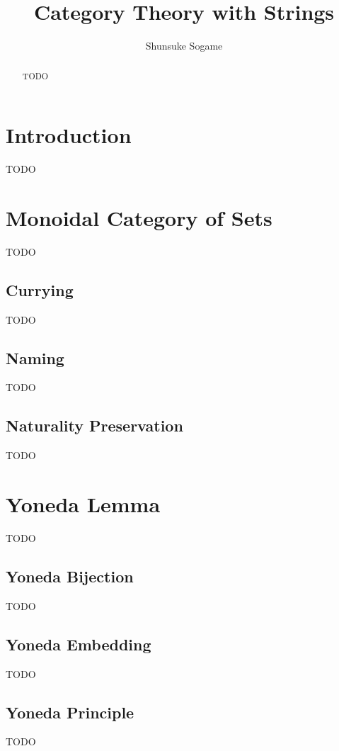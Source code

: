 \documentclass{article}
\title{Category Theory with Strings}
\author{Shunsuke Sogame}
\theoremstyle{break}
\numberwithin{theorem}{section}
\begin{document}
\maketitle

\begin{abstract}
    TODO
\end{abstract}

\section{Introduction}
\label{sec:introduction}
TODO










\section{Monoidal Category of Sets}

TODO
\subsection{Currying}

TODO
\subsection{Naming}

TODO
\subsection{Naturality Preservation}

TODO


\section{Yoneda Lemma}
TODO

\subsection{Yoneda Bijection}
TODO

\subsection{Yoneda Embedding}
TODO

\subsection{Yoneda Principle}
TODO
\end{document}
